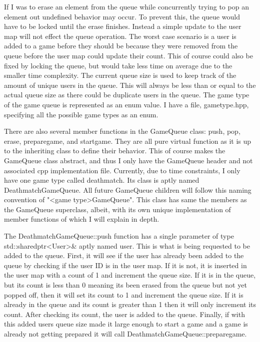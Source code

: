 \documentclass[conference]{IEEEtran}
\begin{document}
If I was to erase an element from the queue while concurrently trying to pop an element out undefined behavior may occur.
To prevent this, the queue would have to be locked until the erase finishes.
Instead a simple update to the user map will not effect the queue operation.
The worst case scenario is a user is added to a game before they should be because they were removed from the queue before the user map could update their count.
This of course could also be fixed by locking the queue, but would take less time on average due to the smaller time complexity.
The current queue size is used to keep track of the amount of unique users in the queue.
This will always be less than or equal to the actual queue size as there could be duplicate users in the queue.
The game type of the game queue is represented as an enum value.
I have a file, game\textunderscore type.hpp, specifying all the possible game types as an enum.

There are also several member functions in the GameQueue class: push, pop, erase, prepare\textunderscore game, and start\textunderscore game.
They are all pure virtual function as it is up to the inheriting class to define their behavior.
This of course makes the GameQueue class abstract, and thus I only have the GameQueue header and not associated cpp implementation file.
Currently, due to time constraints,  I only have one game type called deathmatch.
Its class is aptly named DeathmatchGameQueue.
All future GameQueue children will follow this naming convention of "<game type>GameQueue".
This class has same the members as the GameQueue superclass, albeit, with its own unique implementation of member functions of which I will explain in depth.

The DeathmatchGameQueue::push function has a single parameter of type std::shared\textunderscore ptr<User>& aptly named user.
This is what is being requested to be added to the queue.
First, it will see if the user has already been added to the queue by checking if the user ID is in the user map.
If it is not, it is inserted in the user map with a count of 1 and increment the queue size.
If it is in the queue, but its count is less than 0 meaning its been erased from the queue but not yet popped off, then it will set its count to 1 and increment the queue size.
If it is already in the queue and its count is greater than 1 then it will only increment its count. 
After checking its count, the user is added to the queue.
Finally, if with this added users queue size made it large enough to start a game and a game is already not getting prepared it will call DeathmatchGameQueue::prepare\textunderscore game.
\end{document}
